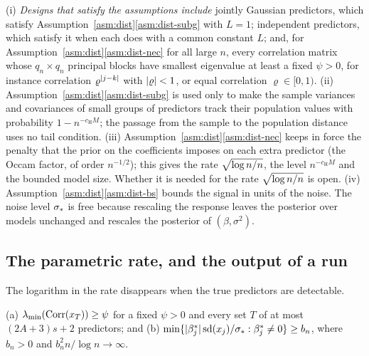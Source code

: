 
\begin{remark}\label{rem:dist-asm}
(i) \emph{Designs that satisfy the assumptions include} jointly Gaussian predictors, which satisfy
Assumption~\ref{asm:dist}\ref{asm:dist-subg} with $L=1$; independent predictors, which satisfy it when each does with a
common constant $L$; and, for Assumption~\ref{asm:dist}\ref{asm:dist-nec} for all large $n$, every correlation matrix
whose $q_n\times q_n$ principal blocks have smallest eigenvalue at least a fixed $\psi>0$, for instance correlation
$\varrho^{\lvert j-k\rvert}$ with $\lvert \varrho\rvert<1$, or equal correlation $\varrho\in[0,1)$.
(ii) Assumption~\ref{asm:dist}\ref{asm:dist-subg} is used only to make the sample variances and covariances of small groups of
predictors track their population values with probability $1-n^{-c_{\mathrm H} M}$; the passage from the sample to the population
distance uses no tail condition.
(iii) Assumption~\ref{asm:dist}\ref{asm:dist-nec} keeps in force the penalty that the prior on the coefficients imposes on
each extra predictor (the Occam factor, of order $n^{-1/2}$); this gives the rate $\sqrt{\log n/n}$, the level $n^{-c_{\mathrm H} M}$ and the bounded model size. Whether it is needed for the rate
$\sqrt{\log n/n}$ is open.
(iv) Assumption~\ref{asm:dist}\ref{asm:dist-bs} bounds the signal in units of the noise. The noise level $\sigma_*$ is free because
rescaling the response leaves the posterior over models unchanged and rescales the posterior of $(\beta,\sigma^2)$.
\end{remark}

\subsection{The parametric rate, and the output of a run}\label{sec:dist-param}

The logarithm in the rate disappears when the true predictors are detectable.


\begin{localassumption}\label{asm:dist-det}
(a) $\lambda_{\min}(\operatorname{Corr}(x_T))\ge\psi$ for a fixed $\psi>0$ and every set $T$ of at most $(2A+3)s+2$ predictors; and (b)
$\min\{\lvert \beta^*_j\rvert\operatorname{sd}(x_j)/\sigma_*:\beta^*_j\neq0\}\ge b_n$, where $b_n>0$ and $b_n^2n/\log n\to\infty$.
\end{localassumption}

